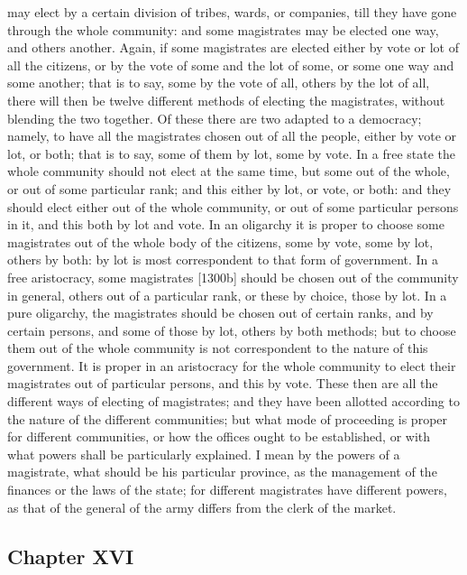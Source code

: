 \documentclass[12pt]{article}
\begin{document}
may elect by a certain division of tribes, wards, or companies, till they have gone through the whole community: and some magistrates may be elected one way, and others another. Again, if some magistrates are elected either by vote or lot of all the citizens, or by the vote of some and the lot of some, or some one way and some another; that is to say, some by the vote of all, others by the lot of all, there will then be twelve different methods of electing the magistrates, without blending the two together. Of these there are two adapted to a democracy; namely, to have all the magistrates chosen out of all the people, either by vote or lot, or both; that is to say, some of them by lot, some by vote. In a free state the whole community should not elect at the same time, but some out of the whole, or out of some particular rank; and this either by lot, or vote, or both: and they should elect either out of the whole community, or out of some particular persons in it, and this both by lot and vote. In an oligarchy it is proper to choose some magistrates out of the whole body of the citizens, some by vote, some by lot, others by both: by lot is most correspondent to that form of government. In a free aristocracy, some magistrates [1300b] should be chosen out of the community in general, others out of a particular rank, or these by choice, those by lot. In a pure oligarchy, the magistrates should be chosen out of certain ranks, and by certain persons, and some of those by lot, others by both methods; but to choose them out of the whole community is not correspondent to the nature of this government. It is proper in an aristocracy for the whole community to elect their magistrates out of particular persons, and this by vote. These then are all the different ways of electing of magistrates; and they have been allotted according to the nature of the different communities; but what mode of proceeding is proper for different communities, or how the offices ought to be established, or with what powers shall be particularly explained. I mean by the powers of a magistrate, what should be his particular province, as the management of the finances or the laws of the state; for different magistrates have different powers, as that of the general of the army differs from the clerk of the market.

\subsection*{Chapter XVI}
\end{document}
